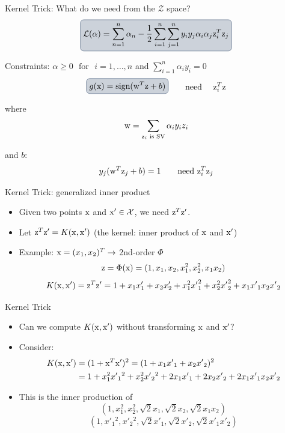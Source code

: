 \begin{frame}{Kernel Trick: What do we need from the $\mathcal{Z}$ space?}
\[\boxed{\mathcal{L}(\alpha ) = \sum_{n=1}^{n}\alpha_n -\frac{1}{2}\sum_{i=1}^{n} \sum\limits_{j= 1}^n y_iy_j\alpha_i\alpha_j {\rm z}_i^T{\rm z}_j}\]

Constraints: $\alpha\geq 0\text{~~for~~}i=1,\ldots,n$ and $\sum_{i=1}^{n}\alpha_i y_{i}=0$
\[\boxed{g({\rm x})=\text{sign}({\rm w}^T{\rm z}+b)}~~~~~~ \text{need}~~~~{\rm z}_i^T{\rm z}\]

where
 \[{\rm w}=\sum\limits_{{\rm z}_i\text{ is SV}} \alpha_i y_{i}z_{i}\]

and $b$:
\[y_{j}({\rm w}^T{\rm z}_j+b)=1~~~~~~\text{need  }  {\rm z}_i^T{\rm z}_j\] 
\end{frame}

\begin{frame}{Kernel Trick: generalized inner product}
\begin{itemize}
\item Given two points ${\rm x}$ and ${\rm x}'\in \mathcal{X}$, we need ${\rm z}^T{\rm z}'$.
\item Let ${\rm z}^T{\rm z}'=K({\rm x},{\rm x}')$   (the kernel: inner product of ${\rm x}$ and ${\rm x}'$)
\item Example: ${\rm x}=(x_1,x_2)^T\rightarrow $ 2nd-order $\Phi$
\[{\rm z}=\Phi({\rm x})=(1,x_1,x_2,x_1^2,x_2^2,x_1x_2)\]
\[K({\rm x},{\rm x}')={\rm z}^T{\rm z}'=1+x_1x_1'+x_2x_2'+x_1^2{x'}_1^2+x_2^2{x'}_2^2+x_1{x'}_1x_2{x'}_2\]
\end{itemize}
\end{frame}

\begin{frame}{Kernel Trick}
\begin{itemize}
\item Can we compute $K({\rm x},{\rm x}')$ without transforming ${\rm x}$ and ${\rm x}'$?
\item Consider: 
\begin{align*}
K({\rm x},{\rm x}') &= {(1 + {{\rm x}^T}{\rm x}')^2} = {(1 + {x_1}x'{_1} + {x_2}x'{_2})^2}\\
&= 1 + x_1^2x'{_1}^2 + x_2^2x'{_2}^2 + 2{x_1}x'{_1} + 2{x_2}x'{_2} + 2{x_1}x'{_1}{x_2}x'{_2}
\end{align*}
\item This is the inner production of
\[(1,x_1^2,x_2^2,\sqrt{2}x_1,\sqrt{2}x_2,\sqrt{2}x_1x_2)\]
\[(1,x'{_1}^2,x'{_2}^2,\sqrt{2}x'{_1},\sqrt{2}x'{_2},\sqrt{2}x'{_1}x'{_2})\]
\end{itemize}
\end{frame}

